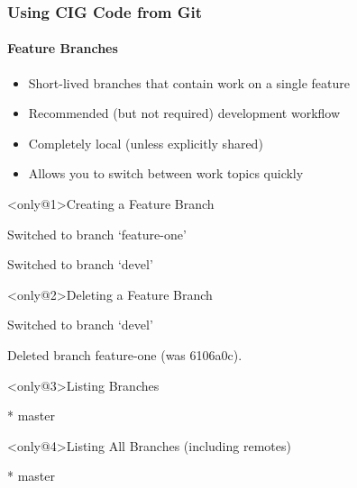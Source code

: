 \begin{frame}[fragile,t]
 \frametitle{Using CIG Code from Git}
 \framesubtitle{Feature Branches}

 \begin{itemize}
  \item Short-lived branches that contain work on a single feature
  \item Recommended (but not required) development workflow
  \item Completely local (unless explicitly shared)
  \item Allows you to switch between work topics quickly
 \end{itemize}

 \begin{exampleblock}<only@1>{Creating a Feature Branch}
  \vspace{-1em}
  \begin{semiverbatim}
Switched to branch `feature-one'

Switched to branch `devel'
\end{semiverbatim}
 \end{exampleblock}

 \begin{exampleblock}<only@2>{Deleting a Feature Branch}
  \vspace{-1em}
  \begin{semiverbatim}
Switched to branch `devel'

Deleted branch feature-one (was 6106a0c).
\end{semiverbatim}
 \end{exampleblock}
 \begin{exampleblock}<only@3>{Listing Branches}
  \vspace{-1em}
  \begin{semiverbatim}
* 
  master
\end{semiverbatim}
 \end{exampleblock}

 \begin{exampleblock}<only@4>{Listing All Branches (including remotes)}
  \vspace{-1em}
  \begin{semiverbatim}
* 
  master
\end{semiverbatim}
 \end{exampleblock}
\end{frame}

